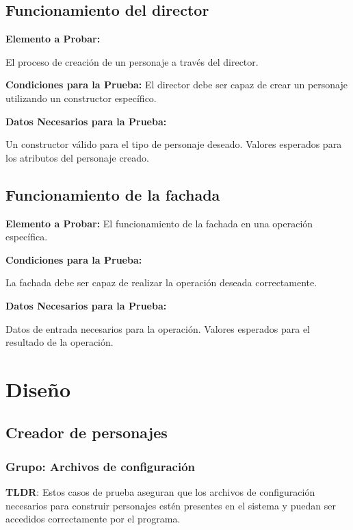 \documentclass{article}
\begin{document}
\begin{itemize}
\subsection{Funcionamiento del director}

   \textbf{ Elemento a Probar:} 
   
   El proceso de creación de un personaje a través del director.
   
   \textbf{ Condiciones para la Prueba:}
        El director debe ser capaz de crear un personaje utilizando un constructor específico.
        
    \textbf{Datos Necesarios para la Prueba:}
    
        Un constructor válido para el tipo de personaje deseado.
        Valores esperados para los atributos del personaje creado.

\subsection{Funcionamiento de la fachada}

   \textbf{ Elemento a Probar:} 
   El funcionamiento de la fachada en una operación específica.
   
    \textbf{Condiciones para la Prueba:}
    
        La fachada debe ser capaz de realizar la operación deseada correctamente.
        
   \textbf{ Datos Necesarios para la Prueba:}
   
        Datos de entrada necesarios para la operación.
        Valores esperados para el resultado de la operación.

\end{itemize}

\section{Diseño}
\subsection{Creador de personajes}
\subsubsection{Grupo: Archivos de configuración}
\textbf{TLDR}:
Estos casos de prueba aseguran que los archivos de configuración necesarios para construir personajes estén presentes en el sistema y puedan ser accedidos correctamente por el programa.
\end{document}
